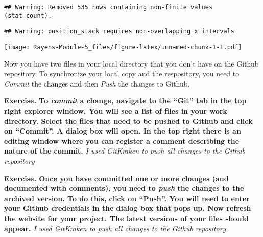 \documentclass[]{article}
\newenvironment{Shaded}{\begin{snugshade}}{\end{snugshade}}
\newcommand{\DataTypeTok}[1]{\textcolor[rgb]{0.13,0.29,0.53}{#1}}
\newcommand{\KeywordTok}[1]{\textcolor[rgb]{0.13,0.29,0.53}{\textbf{#1}}}
\newcommand{\NormalTok}[1]{#1}
\newcommand{\OperatorTok}[1]{\textcolor[rgb]{0.81,0.36,0.00}{\textbf{#1}}}
\newcommand{\StringTok}[1]{\textcolor[rgb]{0.31,0.60,0.02}{#1}}
\begin{document}
\begin{Shaded}
\end{Shaded}

\begin{verbatim}
## Warning: Removed 535 rows containing non-finite values (stat_count).
\end{verbatim}

\begin{verbatim}
## Warning: position_stack requires non-overlapping x intervals
\end{verbatim}

\texttt{[image: Rayens-Module-5\_files/figure-latex/unnamed-chunk-1-1.pdf]}

Now you have two files in your local directory that you don't have on
the Github repository. To synchronize your local copy and the
respository, you need to \emph{Commit} the changes and then \emph{Push}
the changes to Github.

\textbf{Exercise. To \emph{commit} a change, navigate to the ``Git'' tab
in the top right explorer window. You will see a list of files in your
work directory. Select the files that need to be pushed to Github and
click on ``Commit''. A dialog box will open. In the top right there is
an editing window where you can register a comment describing the nature
of the commit.} \emph{I used GitKraken to push all changes to the Github
repository}

\textbf{Exercise. Once you have committed one or more changes (and
documented with comments), you need to \emph{push} the changes to the
archived version. To do this, click on ``Push''. You will need to enter
your Github credentials in the dialog box that pops up. Now refresh the
website for your project. The latest versions of your files should
appear.} \emph{I used GitKraken to push all changes to the Github
repository}
\end{document}
